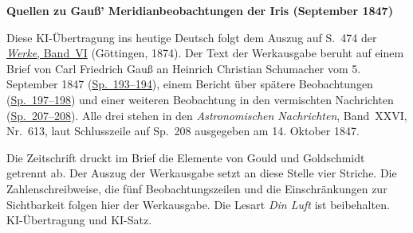 \clearpage\thispagestyle{empty}
\begin{center}\textbf{Quellen zu Gauß’ Meridianbeobachtungen der Iris (September 1847)}\end{center}
\noindent Diese KI-Übertragung ins heutige Deutsch folgt dem Auszug auf S.~474 der \href{https://gdz.sub.uni-goettingen.de/id/PPN236007467}{\textit{Werke}, Band~VI} (Göttingen, 1874). Der Text der Werkausgabe beruht auf einem Brief von Carl Friedrich Gauß an Heinrich Christian Schumacher vom 5. September 1847 (\href{https://api.digitale-sammlungen.de/iiif/image/v2/bsb10049451_00105/full/1800,/0/default.jpg}{Sp.~193--194}), einem Bericht über spätere Beobachtungen (\href{https://api.digitale-sammlungen.de/iiif/image/v2/bsb10049451_00107/full/1800,/0/default.jpg}{Sp.~197--198}) und einer weiteren Beobachtung in den vermischten Nachrichten (\href{https://api.digitale-sammlungen.de/iiif/image/v2/bsb10049451_00112/full/1800,/0/default.jpg}{Sp.~207--208}). Alle drei stehen in den \textit{Astronomischen Nachrichten}, Band~XXVI, Nr.~613, laut Schlusszeile auf Sp.~208 ausgegeben am 14. Oktober 1847.
\par\smallskip\noindent Die Zeitschrift druckt im Brief die Elemente von Gould und Goldschmidt getrennt ab. Der Auszug der Werkausgabe setzt an diese Stelle vier Striche. Die Zahlenschreibweise, die fünf Beobachtungszeilen und die Einschränkungen zur Sichtbarkeit folgen hier der Werkausgabe. Die Lesart \textit{Din Luft} ist beibehalten. KI-Übertragung und KI-Satz.
\clearpage
